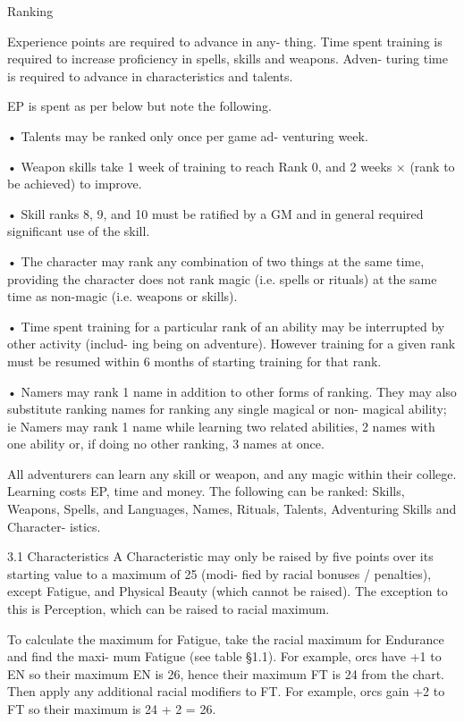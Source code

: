 \begin{Chapter}{Ranking}

Experience  points  are  required  to  advance  in  any-
thing.  Time  spent  training  is  required  to  increase 
proficiency  in  spells,  skills  and  weapons.  Adven-
turing time is required to advance in characteristics 
and talents. 

EP is spent as per below but note the following.  

•  Talents  may  be  ranked  only  once  per  game  ad-
venturing week.  

•  Weapon  skills  take  1  week  of  training  to  reach 
Rank  0,  and  2  weeks  ×  (rank  to  be  achieved)  to 
improve.  

• Skill ranks 8, 9, and 10 must be ratified by a GM 
and in general required significant use of the skill.  

•  The  character  may  rank  any  combination  of  two 
things  at  the  same  time,  providing  the  character 
does  not  rank  magic  (i.e.  spells  or  rituals)  at  the 
same time as non-magic (i.e. weapons or skills).  

•  Time  spent  training  for  a  particular  rank  of  an 
ability may be interrupted by other activity (includ-
ing  being  on  adventure).  However  training  for  a 
given  rank  must  be  resumed  within  6  months  of 
starting training for that rank.  

•  Namers  may  rank  1  name  in  addition  to  other 
forms of ranking. They may also substitute ranking 
names  for  ranking  any  single  magical  or  non-
magical ability; ie Namers may rank 1 name while 
learning  two  related  abilities,  2  names  with  one 
ability  or,  if  doing  no  other  ranking,  3  names  at 
once. 

All adventurers can learn any skill or weapon, and 
any magic within their college. Learning costs EP, 
time  and  money.  The  following  can  be  ranked: 
Skills,  Weapons,  Spells,  and  Languages,  Names, 
Rituals, Talents, Adventuring Skills and Character-
istics. 

3.1 Characteristics 
A Characteristic may only be raised by five points 
over its starting value to a maximum of 25 (modi-
fied  by  racial bonuses  / penalties),  except  Fatigue, 
and Physical Beauty (which cannot be raised). The 
exception to this is Perception, which can be raised 
to racial maximum. 

To  calculate  the  maximum  for  Fatigue,  take  the 
racial maximum for Endurance and find the maxi-
mum  Fatigue  (see  table  §1.1).  For  example,  orcs 
have +1 to EN so their maximum EN is 26, hence 
their maximum FT is 24 from the chart. Then apply 
any additional racial modifiers to FT. For example, 
orcs  gain  +2  to  FT  so  their  maximum is  24  + 2  = 
26. 


\end{Chapter}
